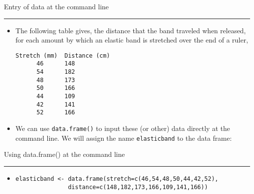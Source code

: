 \documentclass[landscape]{slides}
\newcommand{\red}[0]{\color{Red}}
\newcommand{\blue}[0]{\color{Blue}}
\newcommand{\header}[1]{
    \red
    #1\\
    \rule[1in]{\textwidth}{.01in}
    \vspace{-1.5in}
    \blue
}
\begin{document}
\begin{slide}
\header{Entry of data at the command line}\label{dataentry}
\begin{itemize}
\item
The following table gives, 
the distance that
the band traveled when released,
for each amount by which an
elastic band is stretched over the end of a ruler, 
\begin{verbatim}
Stretch (mm)  Distance (cm)
      46      148
      54      182
      48      173
      50      166
      44      109
      42      141
      52      166
\end{verbatim}
\item We can use \verb+data.frame()+ to input these (or other) 
data directly at the command line. We will assign the name
\verb+elasticband+ to the data frame:
\end{itemize}
\end{slide}
\begin{slide}
\header{Using data.frame() at the command line}
\begin{itemize}
\item[ ]
\begin{verbatim}
elasticband <- data.frame(stretch=c(46,54,48,50,44,42,52),
               distance=c(148,182,173,166,109,141,166))
\end{verbatim}
\end{itemize}
\end{slide}
\end{document}
